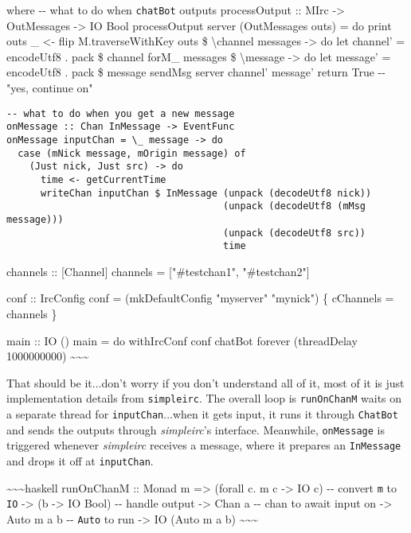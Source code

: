 \documentclass[]{article}
\begin{document}
where -\/- what to do when \texttt{chatBot} outputs processOutput :: MIrc
-\textgreater{} OutMessages -\textgreater{} IO Bool processOutput server
(OutMessages outs) = do print outs \_ \textless{}- flip M.traverseWithKey outs
\$ \textbackslash{}channel messages -\textgreater{} do let channel' = encodeUtf8
. pack \$ channel forM\_ messages \$ \textbackslash{}message -\textgreater{} do
let message' = encodeUtf8 . pack \$ message sendMsg server channel' message'
return True -\/- "yes, continue on"

\begin{verbatim}
-- what to do when you get a new message
onMessage :: Chan InMessage -> EventFunc
onMessage inputChan = \_ message -> do
  case (mNick message, mOrigin message) of
    (Just nick, Just src) -> do
      time <- getCurrentTime
      writeChan inputChan $ InMessage (unpack (decodeUtf8 nick))
                                      (unpack (decodeUtf8 (mMsg message)))
                                      (unpack (decodeUtf8 src))
                                      time
\end{verbatim}

channels :: {[}Channel{]} channels = {[}"\#testchan1", "\#testchan2"{]}

conf :: IrcConfig conf = (mkDefaultConfig "myserver" "mynick") \{ cChannels =
channels \}

main :: IO () main = do withIrcConf conf chatBot forever (threadDelay
1000000000) \textasciitilde{}\textasciitilde{}\textasciitilde{}

That should be it...don't worry if you don't understand all of it, most of it is
just implementation details from \texttt{simpleirc}. The overall loop is
\texttt{runOnChanM} waits on a separate thread for \texttt{inputChan}...when it
gets input, it runs it through \texttt{ChatBot} and sends the outputs through
\emph{simpleirc}'s interface. Meanwhile, \texttt{onMessage} is triggered
whenever \emph{simpleirc} receives a message, where it prepares an
\texttt{InMessage} and drops it off at \texttt{inputChan}.

\textasciitilde{}\textasciitilde{}\textasciitilde{}haskell runOnChanM :: Monad m
=\textgreater{} (forall c. m c -\textgreater{} IO c) -\/- convert \texttt{m} to
\texttt{IO} -\textgreater{} (b -\textgreater{} IO Bool) -\/- handle output
-\textgreater{} Chan a -\/- chan to await input on -\textgreater{} Auto m a b
-\/- \texttt{Auto} to run -\textgreater{} IO (Auto m a b)
\textasciitilde{}\textasciitilde{}\textasciitilde{}
\end{document}
